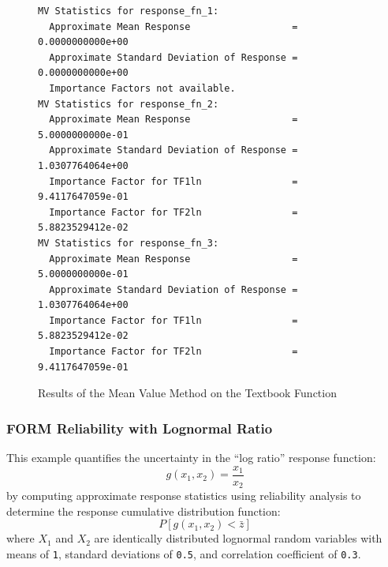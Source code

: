 \begin{figure}[htbp!]
\centering
\begin{bigbox}
\begin{small}
\begin{verbatim}
MV Statistics for response_fn_1:
  Approximate Mean Response                  =  0.0000000000e+00
  Approximate Standard Deviation of Response =  0.0000000000e+00
  Importance Factors not available.
MV Statistics for response_fn_2:
  Approximate Mean Response                  =  5.0000000000e-01
  Approximate Standard Deviation of Response =  1.0307764064e+00
  Importance Factor for TF1ln                =  9.4117647059e-01
  Importance Factor for TF2ln                =  5.8823529412e-02
MV Statistics for response_fn_3:
  Approximate Mean Response                  =  5.0000000000e-01
  Approximate Standard Deviation of Response =  1.0307764064e+00
  Importance Factor for TF1ln                =  5.8823529412e-02
  Importance Factor for TF2ln                =  9.4117647059e-01
\end{verbatim}
\end{small}
\end{bigbox}
\caption{Results of the Mean Value Method on the Textbook Function}
\label{uq:examples:mv_results}
\end{figure}

\subsubsection{FORM Reliability with Lognormal Ratio}

This example quantifies the uncertainty in the ``log ratio'' response
function:
\begin{equation}
g(x_1,x_2) = \frac{x_1}{x_2}
\end{equation}
by computing approximate response statistics using reliability
analysis to determine the response cumulative distribution function:
\begin{equation}
P[g(x_1,x_2) < \bar{z}]
\end{equation}
where $X_1$ and $X_2$ are identically distributed lognormal random
variables with means of \texttt{1}, standard deviations of
\texttt{0.5}, and correlation coefficient of \texttt{0.3}.

